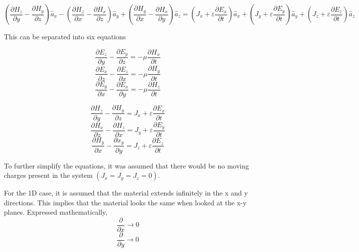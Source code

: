 \documentclass{article}
\begin{document}
\begin{equation}
\left( \frac{\partial H_z}{\partial y}  - \frac{\partial H_y}{\partial z}\right)  \hat{a}_x - \left( \frac{\partial H_z}{\partial x}  - \frac{\partial H_x}{\partial z}\right)  \hat{a}_y + \left( \frac{\partial H_y}{\partial x}  - \frac{\partial H_x}{\partial y}\right)  \hat{a}_z = \left(J_x + \varepsilon \frac{\partial E_x}{\partial t}\right) \hat{a}_x + \left(J_y + \varepsilon \frac{\partial E_y}{\partial t}\right) \hat{a}_y + \left(J_z + \varepsilon \frac{\partial E_z}{\partial t} \right) \hat{a}_z
\end{equation}

This can be separated into six equations

\begin{equation}
\frac{\partial E_z}{\partial y}  - \frac{\partial E_y}{\partial z} = -\mu \frac{\partial H_x}{\partial t}
\end{equation}
\begin{equation}
\frac{\partial E_x}{\partial z}  - \frac{\partial E_z}{\partial x} = -\mu \frac{\partial H_y}{\partial t}
\end{equation}
\begin{equation}
\frac{\partial E_y}{\partial x}  - \frac{\partial E_x}{\partial y} = -\mu \frac{\partial H_z}{\partial t}
\end{equation}

\begin{equation}
\frac{\partial H_z}{\partial y}  - \frac{\partial H_y}{\partial z} = J_x + \varepsilon \frac{\partial E_x}{\partial t}
\end{equation}
\begin{equation}
\frac{\partial H_x}{\partial z}  - \frac{\partial H_z}{\partial x} = J_y + \varepsilon \frac{\partial E_y}{\partial t}
\end{equation}
\begin{equation}
\frac{\partial H_y}{\partial x}  - \frac{\partial x_y}{\partial y} = J_z + \varepsilon \frac{\partial E_z}{\partial t}
\end{equation}

To further simplify the equations, it was assumed that there would be no moving charges present in the system $(J_x = J_y = J_z = 0)$. 

For the 1D case, it is assumed that the material extends infinitely in the x and y directions. This implies that the material looks the same when looked at the x-y planes. Expressed mathematically,
\begin{equation}
\frac{\partial}{\partial x} \rightarrow 0
\end{equation}
\begin{equation}
\frac{\partial}{\partial y} \rightarrow 0
\end{equation}
\end{document}
